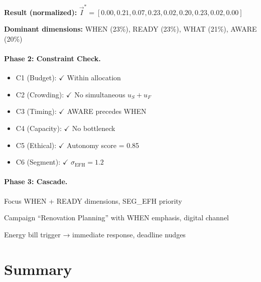 \textbf{Result (normalized):}
$\vec{I}^* = [0.00, 0.21, 0.07, 0.23, 0.02, 0.20, 0.23, 0.02, 0.00]$

\textbf{Dominant dimensions:} WHEN (23\%), READY (23\%), WHAT (21\%), AWARE (20\%)

\paragraph{Phase 2: Constraint Check.}
\begin{itemize}[nosep]
    \item C1 (Budget): $\checkmark$ Within allocation
    \item C2 (Crowding): $\checkmark$ No simultaneous $u_S + u_F$
    \item C3 (Timing): $\checkmark$ AWARE precedes WHEN
    \item C4 (Capacity): $\checkmark$ No bottleneck
    \item C5 (Ethical): $\checkmark$ Autonomy score = 0.85
    \item C6 (Segment): $\checkmark$ $\sigma_{\text{EFH}} = 1.2$
\end{itemize}

\paragraph{Phase 3: Cascade.}
\begin{description}[leftmargin=2em, style=nextline]
    \item[Strategic (Year 1--3):] Focus WHEN + READY dimensions, SEG\_EFH priority
    \item[Tactical (Q1--Q4):] Campaign ``Renovation Planning'' with WHEN emphasis, digital channel
    \item[Operative (Weekly):] Energy bill trigger → immediate response, deadline nudges
\end{description}


\section{Summary}
\label{sec:hhh-summary}

